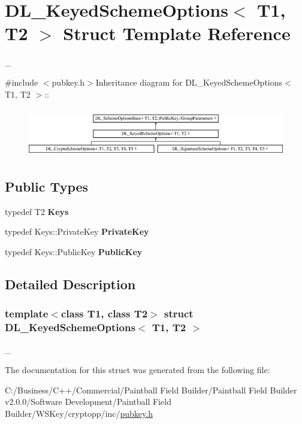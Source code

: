 \hypertarget{struct_d_l___keyed_scheme_options}{
\section{DL\_\-KeyedSchemeOptions$<$ T1, T2 $>$ Struct Template Reference}
\label{struct_d_l___keyed_scheme_options}
}


\_\-  


{\ttfamily \#include $<$pubkey.h$>$}Inheritance diagram for DL\_\-KeyedSchemeOptions$<$ T1, T2 $>$::\begin{figure}[H]
\begin{center}
\leavevmode
\includegraphics[height=2.16495cm]{struct_d_l___keyed_scheme_options}
\end{center}
\end{figure}
\subsection*{Public Types}
\begin{DoxyCompactItemize}
\item 
\hypertarget{struct_d_l___keyed_scheme_options_a8323c3d4c081a19018c75c7fe84ef3a7}{
typedef T2 {\bfseries Keys}}
\label{struct_d_l___keyed_scheme_options_a8323c3d4c081a19018c75c7fe84ef3a7}

\item 
\hypertarget{struct_d_l___keyed_scheme_options_af4d34b9282ed3a9aeb0f38ffa0fce6c9}{
typedef Keys::PrivateKey {\bfseries PrivateKey}}
\label{struct_d_l___keyed_scheme_options_af4d34b9282ed3a9aeb0f38ffa0fce6c9}

\item 
\hypertarget{struct_d_l___keyed_scheme_options_a1eca68865c6e844837eb930d9048b28b}{
typedef Keys::PublicKey {\bfseries PublicKey}}
\label{struct_d_l___keyed_scheme_options_a1eca68865c6e844837eb930d9048b28b}

\end{DoxyCompactItemize}


\subsection{Detailed Description}
\subsubsection*{template$<$class T1, class T2$>$ struct DL\_\-KeyedSchemeOptions$<$ T1, T2 $>$}

\_\- 

The documentation for this struct was generated from the following file:\begin{DoxyCompactItemize}
\item 
C:/Business/C++/Commercial/Paintball Field Builder/Paintball Field Builder v2.0.0/Software Development/Paintball Field Builder/WSKey/cryptopp/inc/\hyperlink{pubkey_8h}{pubkey.h}\end{DoxyCompactItemize}
